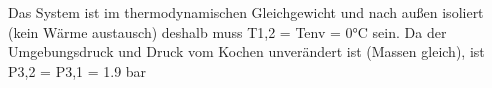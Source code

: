 Das System ist im thermodynamischen Gleichgewicht und nach außen isoliert (kein Wärme austausch) deshalb muss T1,2 = Tenv = 0°C sein. Da der Umgebungsdruck und Druck vom Kochen unverändert ist (Massen gleich), ist P3,2 = P3,1 = 1.9 bar